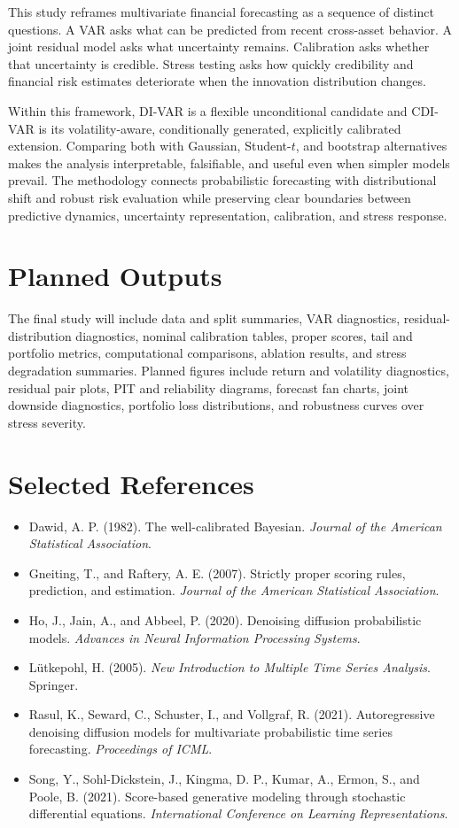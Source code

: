 \documentclass[11pt]{article}
\begin{document}
This study reframes multivariate financial forecasting as a sequence of distinct questions. A VAR asks what can be predicted from recent cross-asset behavior. A joint residual model asks what uncertainty remains. Calibration asks whether that uncertainty is credible. Stress testing asks how quickly credibility and financial risk estimates deteriorate when the innovation distribution changes.

Within this framework, DI-VAR is a flexible unconditional candidate and CDI-VAR is its volatility-aware, conditionally generated, explicitly calibrated extension. Comparing both with Gaussian, Student-$t$, and bootstrap alternatives makes the analysis interpretable, falsifiable, and useful even when simpler models prevail. The methodology connects probabilistic forecasting with distributional shift and robust risk evaluation while preserving clear boundaries between predictive dynamics, uncertainty representation, calibration, and stress response.

\appendix

\section{Planned Outputs}

The final study will include data and split summaries, VAR diagnostics, residual-distribution diagnostics, nominal calibration tables, proper scores, tail and portfolio metrics, computational comparisons, ablation results, and stress degradation summaries. Planned figures include return and volatility diagnostics, residual pair plots, PIT and reliability diagrams, forecast fan charts, joint downside diagnostics, portfolio loss distributions, and robustness curves over stress severity.

\section{Selected References}

\begin{itemize}
    \item Dawid, A. P. (1982). The well-calibrated Bayesian. \emph{Journal of the American Statistical Association}.
    \item Gneiting, T., and Raftery, A. E. (2007). Strictly proper scoring rules, prediction, and estimation. \emph{Journal of the American Statistical Association}.
    \item Ho, J., Jain, A., and Abbeel, P. (2020). Denoising diffusion probabilistic models. \emph{Advances in Neural Information Processing Systems}.
    \item L{\"u}tkepohl, H. (2005). \emph{New Introduction to Multiple Time Series Analysis}. Springer.
    \item Rasul, K., Seward, C., Schuster, I., and Vollgraf, R. (2021). Autoregressive denoising diffusion models for multivariate probabilistic time series forecasting. \emph{Proceedings of ICML}.
    \item Song, Y., Sohl-Dickstein, J., Kingma, D. P., Kumar, A., Ermon, S., and Poole, B. (2021). Score-based generative modeling through stochastic differential equations. \emph{International Conference on Learning Representations}.
\end{itemize}
\end{document}
